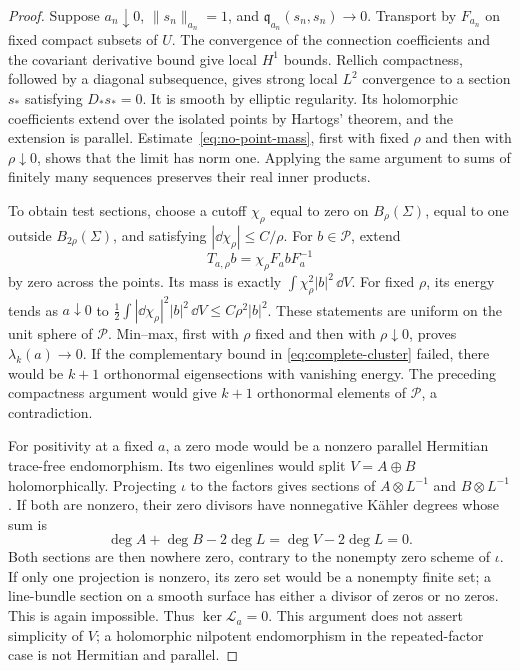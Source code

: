 \begin{proof}
Suppose \(a_n\downarrow0\), \(\|s_n\|_{a_n}=1\), and
\(\mathfrak q_{a_n}(s_n,s_n)\to0\).
Transport by \(F_{a_n}\) on fixed compact subsets of \(U\).
The convergence of the connection coefficients and the covariant
derivative bound give local \(H^1\) bounds. Rellich compactness,
followed by a diagonal subsequence, gives strong local \(L^2\)
convergence to a section \(s_*\) satisfying \(D_*s_*=0\).
It is smooth by elliptic regularity. Its holomorphic coefficients
extend over the isolated points by Hartogs' theorem, and the
extension is parallel. Estimate~\eqref{eq:no-point-mass}, first
with fixed \(\rho\) and then with \(\rho\downarrow0\), shows that
the limit has norm one. Applying the same argument to sums of
finitely many sequences preserves their real inner products.

To obtain test sections, choose a cutoff \(\chi_\rho\) equal to
zero on \(B_\rho(\Sigma)\), equal to one outside \(B_{2\rho}(\Sigma)\),
and satisfying \(|\dd\chi_\rho|\le C/\rho\). For \(b\in\mathcal P\),
extend
\[
 T_{a,\rho}b=\chi_\rho F_abF_a^{-1}
\]
by zero across the points. Its mass is exactly
\(\int\chi_\rho^2|b|^2\,\dd V\). For fixed \(\rho\), its energy
tends as \(a\downarrow0\) to
\(\frac12\int|\dd\chi_\rho|^2|b|^2\,\dd V\le C\rho^2|b|^2\).
These statements are uniform on the unit sphere of \(\mathcal P\).
Min--max, first with \(\rho\) fixed and then with
\(\rho\downarrow0\), proves \(\lambda_k(a)\to0\).
If the complementary bound in \eqref{eq:complete-cluster} failed,
there would be \(k+1\) orthonormal eigensections with vanishing
energy. The preceding compactness argument would give \(k+1\)
orthonormal elements of \(\mathcal P\), a contradiction.

For positivity at a fixed \(a\), a zero mode would be a nonzero
parallel Hermitian trace-free endomorphism. Its two eigenlines
would split \(V=A\oplus B\) holomorphically. Projecting \(\iota\)
to the factors gives sections of \(A\otimes L^{-1}\) and
\(B\otimes L^{-1}\). If both are nonzero, their zero divisors
have nonnegative Kähler degrees whose sum is
\[
 \deg A+\deg B-2\deg L=\deg V-2\deg L=0.
\]
Both sections are then nowhere zero, contrary to the nonempty
zero scheme of \(\iota\). If only one projection is nonzero,
its zero set would be a nonempty finite set; a line-bundle
section on a smooth surface has either a divisor of zeros or
no zeros. This is again impossible. Thus \(\ker\mathcal L_a=0\).
This argument does not assert simplicity of \(V\); a holomorphic
nilpotent endomorphism in the repeated-factor case is not
Hermitian and parallel.


\end{proof}
